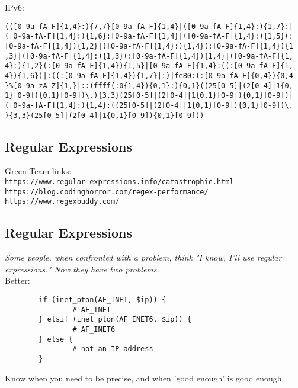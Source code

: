 \documentclass[xga]{xdvislides}
\begin{document}
IPv6:
\begin{verbatim}
(([0-9a-fA-F]{1,4}:){7,7}[0-9a-fA-F]{1,4}|([0-9a-fA-F]{1,4}:){1,7}:|
([0-9a-fA-F]{1,4}:){1,6}:[0-9a-fA-F]{1,4}|([0-9a-fA-F]{1,4}:){1,5}(:
[0-9a-fA-F]{1,4}){1,2}|([0-9a-fA-F]{1,4}:){1,4}(:[0-9a-fA-F]{1,4}){1
,3}|([0-9a-fA-F]{1,4}:){1,3}(:[0-9a-fA-F]{1,4}){1,4}|([0-9a-fA-F]{1,
4}:){1,2}(:[0-9a-fA-F]{1,4}){1,5}|[0-9a-fA-F]{1,4}:((:[0-9a-fA-F]{1,
4}){1,6})|:((:[0-9a-fA-F]{1,4}){1,7}|:)|fe80:(:[0-9a-fA-F]{0,4}){0,4
}%[0-9a-zA-Z]{1,}|::(ffff(:0{1,4}){0,1}:){0,1}((25[0-5]|(2[0-4]|1{0,
1}[0-9]){0,1}[0-9])\.){3,3}(25[0-5]|(2[0-4]|1{0,1}[0-9]){0,1}[0-9])|
([0-9a-fA-F]{1,4}:){1,4}:((25[0-5]|(2[0-4]|1{0,1}[0-9]){0,1}[0-9])\.
){3,3}(25[0-5]|(2[0-4]|1{0,1}[0-9]){0,1}[0-9]))
\end{verbatim}

\subsection{Regular Expressions}
Green Team links: \\

\verb+https://www.regular-expressions.info/catastrophic.html+
\\

\vspace{.5in}
\verb+https://blog.codinghorror.com/regex-performance/+
\\

\vspace{.5in}
\verb+https://www.regexbuddy.com/+

\subsection{Regular Expressions}
{\em Some people, when confronted with a problem,
think "I know, I'll use regular expressions." Now they
have two problems.} \\

Better:
\begin{verbatim}
        if (inet_pton(AF_INET, $ip)) {
                # AF_INET
        } elsif (inet_pton(AF_INET6, $ip)) {
                # AF_INET6
        } else {
                # not an IP address
        }
\end{verbatim}

Know when you need to be precise, and when 'good
enough' is good enough.
\end{document}
